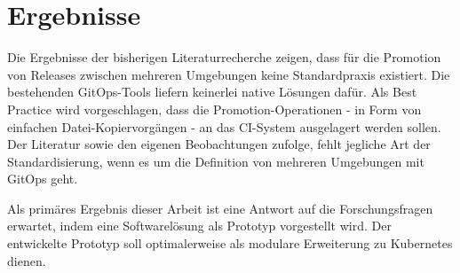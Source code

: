 \chapter{Ergebnisse}

Die Ergebnisse der bisherigen Literaturrecherche zeigen,
dass für die Promotion von Releases zwischen mehreren Umgebungen
keine Standardpraxis existiert. 
Die bestehenden GitOps-Tools liefern
keinerlei native Lösungen dafür.
Als Best Practice wird vorgeschlagen, dass die Promotion-Operationen
- in Form von einfachen Datei-Kopiervorgängen -
an das CI-System ausgelagert werden sollen.
%
Der Literatur sowie den eigenen Beobachtungen zufolge,
fehlt jegliche Art der Standardisierung,
wenn es um die Definition von mehreren Umgebungen mit GitOps geht.
\bigskip

\noindent
Als primäres Ergebnis dieser Arbeit ist
eine Antwort auf die Forschungsfragen erwartet,
indem eine Softwarelösung als Prototyp vorgestellt wird.
Der entwickelte Prototyp soll optimalerweise als 
modulare Erweiterung zu Kubernetes dienen.
\bigskip

%
